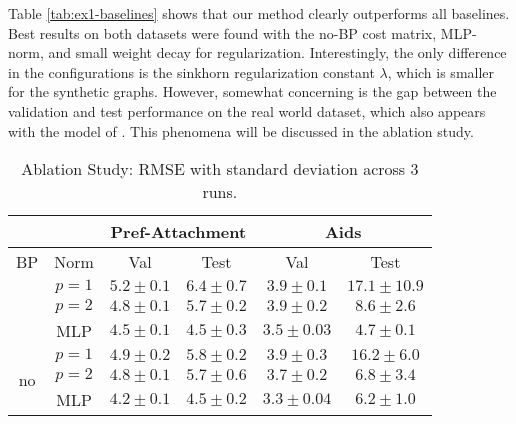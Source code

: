 Table \ref{tab:ex1-baselines} shows that our method clearly outperforms all baselines. Best results on both datasets were found with the no-BP cost matrix, MLP-norm, and small weight decay for regularization. Interestingly, the only difference in the configurations is the  sinkhorn regularization constant $\lambda$, which is smaller for the synthetic graphs. However, somewhat concerning is the gap between the validation and test performance on the real world dataset, which also appears with the model of \cite{bai2019}. This phenomena will be discussed in the ablation study.


\begin{table}[htbp]
    \addtolength{\tabcolsep}{-1pt}
    \fontsize{9pt}{10.25pt}\selectfont
    \centering
    \renewcommand{\arraystretch}{1.2}
    \begin{tabular}{|c|c|c|c|c|c|}
        \hline
        \multicolumn{2}{|c|}{} & \multicolumn{2}{c|}{Pref-Attachment} & \multicolumn{2}{c|}{Aids} \\ \hline
        BP & Norm & Val & Test & Val & Test \\ \hhline{|=|=|=|=|=|=|}
        \multirow{3}{*}{yes} & $p=1$ & $5.2 \pm 0.1$ & $6.4 \pm 0.7$ & $3.9 \pm 0.1$ & $17.1 \pm 10.9$ \\ \hhline{|~|-|-|-|-|-|}
        & $p=2$ & $4.8 \pm 0.1$ & $5.7 \pm 0.2$ & $3.9 \pm 0.2$ & $8.6 \pm 2.6$ \\ \hhline{|~|-|-|-|-|-|}
        & MLP & $4.5 \pm 0.1$ & $\boldsymbol{4.5 \pm 0.3}$ & $3.5 \pm 0.03$ & $\boldsymbol{4.7 \pm 0.1}$ \\ \hline
        \multirow{3}{*}{no}  & $p=1$ & $4.9 \pm 0.2$ & $5.8 \pm 0.2$ & $3.9 \pm 0.3$ & $16.2 \pm 6.0$ \\ \hhline{|~|-|-|-|-|-|}
        & $p=2$ & $4.8 \pm 0.1$ & $5.7 \pm 0.6$ & $3.7 \pm 0.2$ & $6.8 \pm 3.4$ \\ \hhline{|~|-|-|-|-|-|}
        & MLP & $4.2 \pm 0.1$ & $\boldsymbol{4.5 \pm 0.2}$ & $3.3 \pm 0.04$ & $6.2 \pm 1.0$ \\ \hline
    \end{tabular}
    \caption{Ablation Study: RMSE with standard deviation across 3 runs.}
    \label{tab:ex1-ablation}
\end{table}

